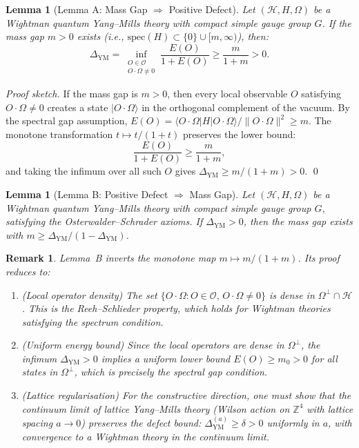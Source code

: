 \documentclass[11pt]{article}
\newtheorem{lemma}[theorem]{Lemma}
\newtheorem{remark}[theorem]{Remark}
\begin{document}
\begin{lemma}[Lemma A: Mass Gap $\Rightarrow$ Positive Defect]
\label{lem:ym-A}
Let $(\mathcal{H}, H, \Omega)$ be a Wightman quantum Yang--Mills theory with compact simple gauge group $G$. If the mass gap $m > 0$ exists (i.e., $\mathrm{spec}(H) \subset \{0\} \cup [m, \infty)$), then:
\[
  \Delta_{\mathrm{YM}} = \inf_{\substack{O \in \mathcal{O} \\ O \cdot \Omega \neq 0}} \frac{E(O)}{1 + E(O)} \geq \frac{m}{1 + m} > 0.
\]
\end{lemma}

\begin{proof}[Proof sketch]
If the mass gap is $m > 0$, then every local observable $O$ satisfying $O \cdot \Omega \neq 0$ creates a state $|O \cdot \Omega\rangle$ in the orthogonal complement of the vacuum. By the spectral gap assumption, $E(O) = \langle O \cdot \Omega | H | O \cdot \Omega \rangle / \|O \cdot \Omega\|^2 \geq m$. The monotone transformation $t \mapsto t/(1+t)$ preserves the lower bound:
\[
  \frac{E(O)}{1 + E(O)} \geq \frac{m}{1 + m},
\]
and taking the infimum over all such $O$ gives $\Delta_{\mathrm{YM}} \geq m/(1+m) > 0$. \qed
\end{proof}

\begin{lemma}[Lemma B: Positive Defect $\Rightarrow$ Mass Gap]
\label{lem:ym-B}
Let $(\mathcal{H}, H, \Omega)$ be a Wightman quantum Yang--Mills theory with compact simple gauge group $G$, satisfying the Osterwalder--Schrader axioms. If $\Delta_{\mathrm{YM}} > 0$, then the mass gap exists with $m \geq \Delta_{\mathrm{YM}} / (1 - \Delta_{\mathrm{YM}})$.
\end{lemma}

\begin{remark}
Lemma~B inverts the monotone map $m \mapsto m/(1+m)$. Its proof reduces to:
\begin{enumerate}
  \item[\textbf{B.1}] \emph{(Local operator density)} The set $\{O \cdot \Omega : O \in \mathcal{O},\, O \cdot \Omega \neq 0\}$ is dense in $\Omega^\perp \cap \mathcal{H}$. This is the Reeh--Schlieder property, which holds for Wightman theories satisfying the spectrum condition.
  \item[\textbf{B.2}] \emph{(Uniform energy bound)} Since the local operators are dense in $\Omega^\perp$, the infimum $\Delta_{\mathrm{YM}} > 0$ implies a uniform lower bound $E(O) \geq m_0 > 0$ for \emph{all} states in $\Omega^\perp$, which is precisely the spectral gap condition.
  \item[\textbf{B.3}] \emph{(Lattice regularisation)} For the constructive direction, one must show that the continuum limit of lattice Yang--Mills theory (Wilson action on $\mathbb{Z}^4$ with lattice spacing $a \to 0$) preserves the defect bound: $\Delta_{\mathrm{YM}}^{(a)} \geq \delta > 0$ uniformly in $a$, with convergence to a Wightman theory in the continuum limit.
\end{enumerate}
\end{remark}
\end{document}
